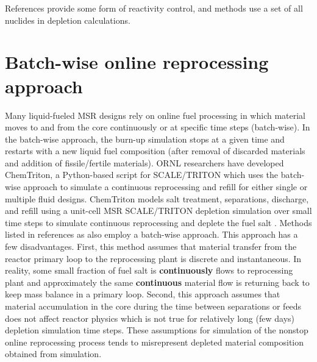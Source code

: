References \cite{li_optimization_2018,de_troullioud_de_lanversin_toward_2017,doligez_coupled_2014,
heuer_towards_2014, sheu_depletion_2013, aufiero_extended_2013} provide some form of reactivity control, 
and methods \cite{doligez_coupled_2014,heuer_towards_2014,aufiero_extended_2013,ahmad_neutronics_2015, 
park_whole_2015,jeong_equilibrium_2016,rykhlevskii_modeling_2019,nuttin_potential_2005} use a set of all nuclides in depletion calculations. 

\section{Batch-wise online reprocessing approach}
Many liquid-fueled \gls{MSR} designs rely on online fuel processing in which  
material moves to and from the core continuously or at specific time steps 
(batch-wise). In the batch-wise approach, the burn-up simulation stops at a given 
time and restarts with a new liquid fuel composition (after removal of discarded 
materials and addition of fissile/fertile materials). \gls{ORNL} researchers 
have developed ChemTriton, a Python-based script for SCALE/TRITON which uses the 
batch-wise approach to simulate a continuous reprocessing and refill for 
either single or multiple fluid designs. ChemTriton models salt 
treatment, separations, discharge, and refill using a unit-cell \gls{MSR} 
SCALE/TRITON depletion simulation over small time steps to simulate continuous 
reprocessing and deplete the fuel salt \cite{powers_new_2013}. Methods listed in 
references \cite{zhou_fuel_2018-1, sheu_depletion_2013,
park_whole_2015, jeong_equilibrium_2016, powers_inventory_2014,
betzler_molten_2017,rykhlevskii_modeling_2019} 
as also employ a batch-wise approach. This approach has a few disadvantages. 
First, this method assumes that material transfer from the reactor primary 
loop to the reprocessing plant is discrete and instantaneous. In reality, 
some small fraction of fuel salt is \textbf{continuously} flows to 
reprocessing plant and approximately the same \textbf{continuous} material flow 
is returning back to keep mass balance in a primary loop. Second, this approach 
assumes that material accumulation in the core 
during the time between separations or feeds does not affect reactor physics which 
is not true for relatively long (few days) depletion simulation time steps. 
These assumptions for simulation of the nonstop online reprocessing process 
tends to misrepresent depleted material composition obtained from simulation.

